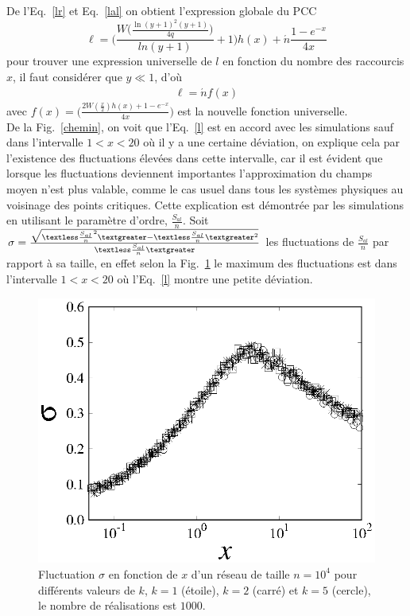 De l'Eq.~\eqref{lr} et Eq.~\eqref{lal} on obtient l'expression globale du PCC 
\begin{equation}
\ell=\bigg(\frac{W\big(\frac{\ln(y+1)^2(y+1)}{4q}\big)}{ln(y+1)}+1\bigg)h(x)+\acute{n}\frac{1-e^{-x}}{4x}
\label{l}
\end{equation}
pour trouver une expression universelle de $l$ en fonction du nombre des raccourcis $x$, il faut considérer que $y\ll 1$, d'où
\begin{eqnarray}
\ell=\acute{n}f(x) 
\label{l2}
\end{eqnarray}
avec $f(x)=\big(\frac{2W(\frac{x}{2})h(x)+1-e^{-x}}{4x}\big)$ est la nouvelle fonction universelle.\\
De la Fig.~\ref{chemin}, on voit que l'Eq.~\eqref{l} est en accord avec les simulations sauf dans l'intervalle
$1<x<20$  où il y a une certaine déviation, on explique cela par l'existence des fluctuations élevées dans cette intervalle, car il est évident que lorsque les fluctuations deviennent importantes l'approximation du champs moyen n'est plus valable,  comme le cas usuel dans tous les systèmes physiques au voisinage des points critiques. Cette explication est démontrée par les simulations en utilisant le paramètre
d'ordre, $\frac{S_{al}}{n}$.
Soit $\sigma=\frac{\sqrt{\textless \frac{S_{al}}{n}^2\textgreater-\textless \frac{S_{al}}{n}\textgreater^2}}{\textless \frac{S_{al}}{n}\textgreater}$
les fluctuations de $\frac{S_{al}}{n}$ par rapport à sa taille,  en effet selon la Fig.~\ref{fluct} le maximum des fluctuations
est dans l'intervalle $1<x<20$ où l'Eq.~\eqref{l} montre une petite déviation.\\

\begin{figure}[h!]
	\centering
	\includegraphics[scale=1,angle=0]{./figures/fig-f}
	\caption{Fluctuation $\sigma$ en fonction de $x$ d'un réseau de taille $n=10^4$  pour différents valeurs de $k$, $k=1$ (étoile), $k=2$ (carré) et $k=5$ (cercle), le nombre de réalisations est $1000$.}
	\label{fluct}
\end{figure}

